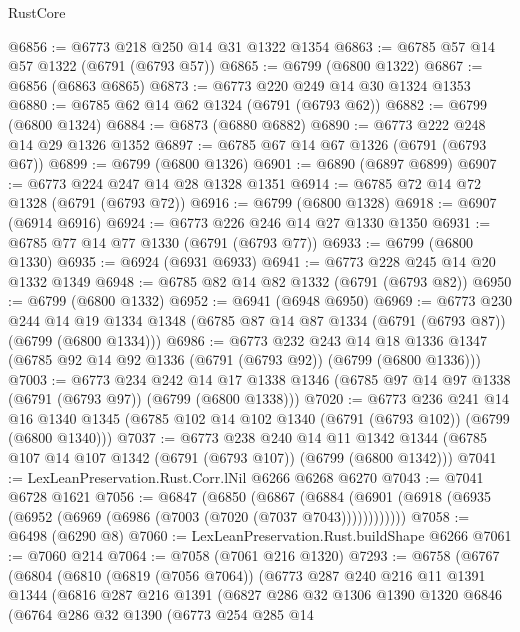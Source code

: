 \begin{lexlean}{RustCore}
\begin{coremodule}
@6856 := @6773 @218 @250 @14 @31 @1322 @1354
@6863 := @6785 @57 @14 @57 @1322 (@6791 (@6793 @57))
@6865 := @6799 (@6800 @1322)
@6867 := @6856 (@6863 @6865)
@6873 := @6773 @220 @249 @14 @30 @1324 @1353
@6880 := @6785 @62 @14 @62 @1324 (@6791 (@6793 @62))
@6882 := @6799 (@6800 @1324)
@6884 := @6873 (@6880 @6882)
@6890 := @6773 @222 @248 @14 @29 @1326 @1352
@6897 := @6785 @67 @14 @67 @1326 (@6791 (@6793 @67))
@6899 := @6799 (@6800 @1326)
@6901 := @6890 (@6897 @6899)
@6907 := @6773 @224 @247 @14 @28 @1328 @1351
@6914 := @6785 @72 @14 @72 @1328 (@6791 (@6793 @72))
@6916 := @6799 (@6800 @1328)
@6918 := @6907 (@6914 @6916)
@6924 := @6773 @226 @246 @14 @27 @1330 @1350
@6931 := @6785 @77 @14 @77 @1330 (@6791 (@6793 @77))
@6933 := @6799 (@6800 @1330)
@6935 := @6924 (@6931 @6933)
@6941 := @6773 @228 @245 @14 @20 @1332 @1349
@6948 := @6785 @82 @14 @82 @1332 (@6791 (@6793 @82))
@6950 := @6799 (@6800 @1332)
@6952 := @6941 (@6948 @6950)
@6969 := @6773
    @230
    @244
    @14
    @19
    @1334
    @1348
    (@6785 @87 @14 @87 @1334 (@6791 (@6793 @87)) (@6799 (@6800 @1334)))
@6986 := @6773
    @232
    @243
    @14
    @18
    @1336
    @1347
    (@6785 @92 @14 @92 @1336 (@6791 (@6793 @92)) (@6799 (@6800 @1336)))
@7003 := @6773
    @234
    @242
    @14
    @17
    @1338
    @1346
    (@6785 @97 @14 @97 @1338 (@6791 (@6793 @97)) (@6799 (@6800 @1338)))
@7020 := @6773
    @236
    @241
    @14
    @16
    @1340
    @1345
    (@6785 @102 @14 @102 @1340 (@6791 (@6793 @102)) (@6799 (@6800 @1340)))
@7037 := @6773
    @238
    @240
    @14
    @11
    @1342
    @1344
    (@6785 @107 @14 @107 @1342 (@6791 (@6793 @107)) (@6799 (@6800 @1342)))
@7041 := LexLeanPreservation.Rust.Corr.lNil @6266 @6268 @6270
@7043 := @7041 @6728 @1621
@7056 := @6847
    (@6850
      (@6867 (@6884 (@6901 (@6918 (@6935 (@6952 (@6969 (@6986 (@7003 (@7020 (@7037 @7043))))))))))))
@7058 := @6498 (@6290 @8)
@7060 := LexLeanPreservation.Rust.buildShape @6266
@7061 := @7060 @214
@7064 := @7058 (@7061 @216 @1320)
@7293 := @6758
    (@6767
      (@6804
        (@6810
          (@6819 (@7056 @7064))
          (@6773
            @287
            @240
            @216
            @11
            @1391
            @1344
            (@6816
              @287
              @216
              @1391
              (@6827
                @286
                @32
                @1306
                @1390
                @1320
                @6846
                (@6764
                  @286
                  @32
                  @1390
                  (@6773
                    @254
                    @285
                    @14

\end{coremodule}
\end{lexlean}
